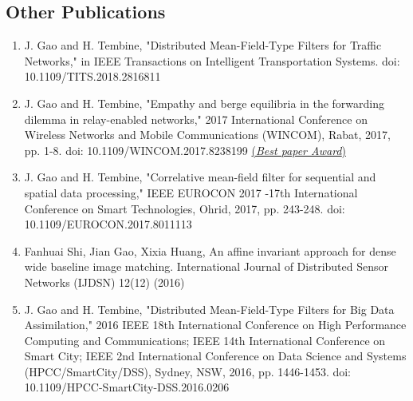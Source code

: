\documentclass{article}
\begin{document}
\subsection{Other Publications}
\begin{enumerate}
\item[] J. Gao and H. Tembine, "Distributed Mean-Field-Type Filters for Traffic Networks," in IEEE Transactions on Intelligent Transportation Systems. doi: 10.1109/TITS.2018.2816811
\item[] J. Gao and H. Tembine, "Empathy and berge equilibria in the forwarding dilemma in relay-enabled networks," 2017 International Conference on Wireless Networks and Mobile Communications (WINCOM), Rabat, 2017, pp. 1-8. doi: 10.1109/WINCOM.2017.8238199 \href{https://nyuad.nyu.edu/en/news/latest-news/science-and-technology/2017/december/next-generation-cell-phone-networks.html}{(\textit{Best paper Award})}
\item[] J. Gao and H. Tembine, "Correlative mean-field filter for sequential and spatial data processing," IEEE EUROCON 2017 -17th International Conference on Smart Technologies, Ohrid, 2017, pp. 243-248. doi: 10.1109/EUROCON.2017.8011113
\item[] Fanhuai Shi, Jian Gao, Xixia Huang, An affine invariant approach for dense wide baseline image matching. International Journal of Distributed Sensor Networks (IJDSN) 12(12) (2016)
\item[] J. Gao and H. Tembine, "Distributed Mean-Field-Type Filters for Big Data Assimilation," 2016 IEEE 18th International Conference on High Performance Computing and Communications; IEEE 14th International Conference on Smart City; IEEE 2nd International Conference on Data Science and Systems (HPCC/SmartCity/DSS), Sydney, NSW, 2016, pp. 1446-1453. doi: 10.1109/HPCC-SmartCity-DSS.2016.0206
\end{enumerate}



%

\cite{NIPS2014_5423}



\end{document}
